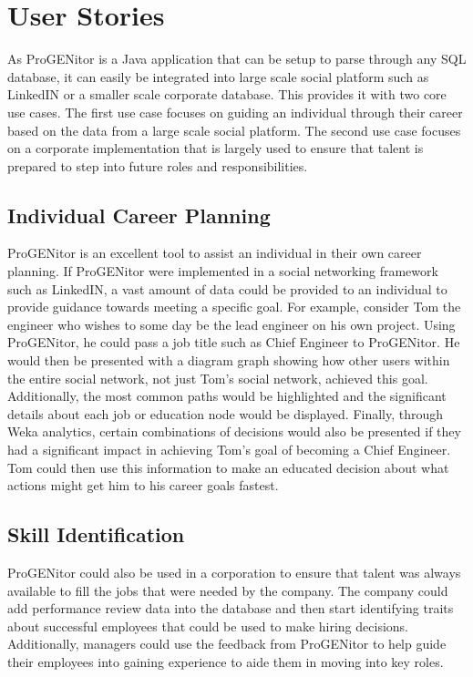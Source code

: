 \section{User Stories}
\label{sect:user-stories}
	As ProGENitor is a Java application that can be setup to parse through any SQL
database, it can easily be integrated into large scale social platform such as
LinkedIN or a smaller scale corporate database.  This provides it with two core
use cases.  The first use case focuses on guiding an individual through their
career based on the data from a large scale social platform.  The second use
case focuses on a corporate implementation that is largely used to ensure that talent is
prepared to step into future roles and responsibilities.
\subsection{Individual Career Planning}
		ProGENitor is an excellent tool to assist an individual in their own career
	planning.  If ProGENitor were implemented in a social networking framework such
	as LinkedIN, a vast amount of data could be provided to an individual to
	provide guidance towards meeting a specific goal.  For example, consider Tom
	the engineer who wishes to some day be the lead engineer on his own project. 
	Using ProGENitor, he could pass a job title such as Chief Engineer to ProGENitor.  He
	would then be presented with a diagram graph showing how other users within
	the entire social network, not just Tom's social network, achieved this goal. 
	Additionally, the most common paths would be highlighted and the significant
	details about each job or education node would be displayed.  Finally,
	through Weka analytics, certain combinations of decisions would also be
	presented if they had a significant impact in achieving Tom's goal of
	becoming a Chief Engineer.  Tom could then use this information to make an
	educated decision about what actions might get him to his career goals fastest.
\subsection{Skill Identification}
		ProGENitor could also be used in a corporation to ensure that talent was
	always available to fill the jobs that were needed by the company.  The company
	could add performance review data into the database and then start identifying
	traits about successful employees that could be used to make hiring decisions. 
	Additionally, managers could use the feedback from ProGENitor to help guide
	their employees into gaining experience to aide them in moving into key roles. 
	
